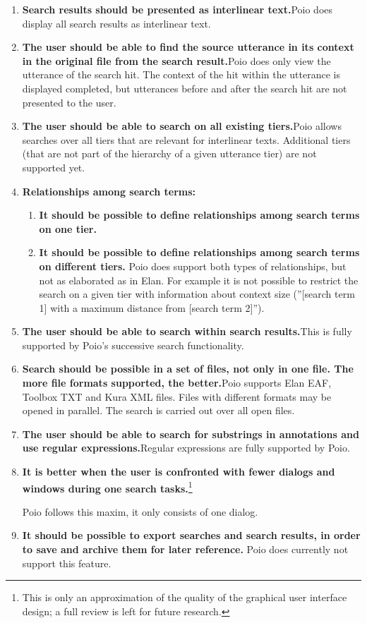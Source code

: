 \begin{enumerate}
\item \textbf{Search results should be presented as interlinear text.}Poio does display all search results as interlinear text.
\item \textbf{The user should be able to find the source utterance in its context in the original file from the search result.}Poio does only view the utterance of the search hit. The context of the hit within the utterance is displayed completed, but utterances before and after the search hit are not presented to the user.
\item \textbf{The user should be able to search on all existing tiers.}Poio allows searches over all tiers that are relevant for interlinear texts. Additional tiers (that are not part of the hierarchy of a given utterance tier) are not supported yet.
\item \textbf{Relationships among search terms:}

 \begin{enumerate}
 \item \textbf{It should be possible to define relationships among search terms on one tier.}
 \item \textbf{It should be possible to define relationships among search terms on different tiers.}
 Poio does support both types of relationships, but not as elaborated as in Elan. For example it is not possible to restrict the search on a given tier with information about context size (''[search term 1] with a maximum distance from [search term 2]{\textquotedblright}).
 \end{enumerate}
\item \textbf{The user should be able to search within search results.}This is fully supported by Poio's successive search functionality.
\item \textbf{Search should be possible in a set of files, not only in one file. The more file formats supported, the better.}Poio supports Elan EAF, Toolbox TXT and Kura XML files. Files with different formats may be opened in parallel. The search is carried out over all open files.
\item \textbf{The user should be able to search for substrings in annotations and use regular expressions.}Regular expressions are fully supported by Poio.
\item \textbf{It is better when the user is confronted with fewer dialogs and windows during one search tasks.}\footnote{This 
 is only an approximation of the quality of the graphical user interface design; a full review is left for future research.
}

Poio follows this maxim, it only consists of one dialog.
\item \textbf{It should be possible to export searches and search results, in order to save and archive them for later reference.} Poio does currently not support this feature.
\end{enumerate}

